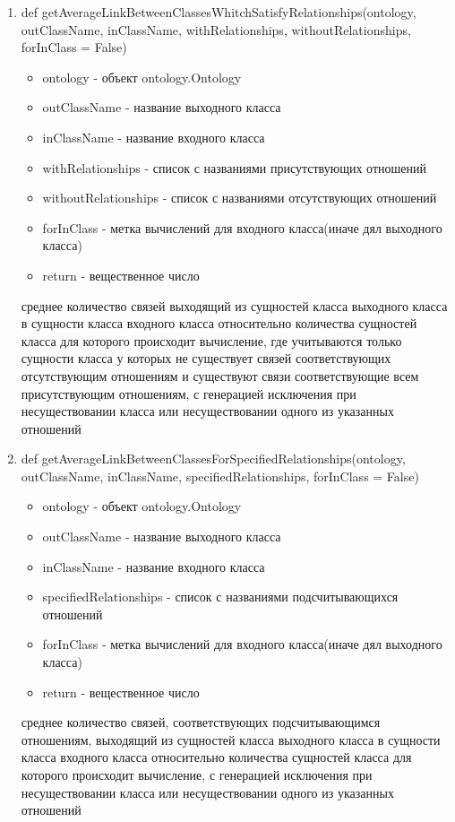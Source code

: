 \documentclass{article}
\begin{document}
\begin{enumerate}
		\item def getAverageLinkBetweenClassesWhitchSatisfyRelationships(ontology, outClassName, inClassName, withRelationships, withoutRelationships, forInClass = False)
		\begin{itemize}
			\item ontology - объект ontology.Ontology
			\item outClassName - название выходного класса
			\item inClassName - название входного класса
			\item withRelationships - список с названиями присутствующих отношений
			\item withoutRelationships - список с названиями отсутствующих отношений
			\item forInClass - метка вычислений для входного класса(иначе дял выходного класса)
			\item return - вещественное число
		\end{itemize}
		среднее количество связей выходящий из сущностей класса выходного класса в сущности класса входного класса относительно количества сущностей класса для которого происходит вычисление, где учитываются только сущности класса у которых не существует связей соответствующих отсутствующим отношениям и существуют связи соответствующие всем присутствующим отношениям, с генерацией исключения при несуществовании класса или несуществовании одного из указанных отношений 
		
		\item def getAverageLinkBetweenClassesForSpecifiedRelationships(ontology, outClassName, inClassName, specifiedRelationships, forInClass = False)
		\begin{itemize}
			\item ontology - объект ontology.Ontology
			\item outClassName - название выходного класса
			\item inClassName - название входного класса
			\item specifiedRelationships - список с названиями подсчитывающихся отношений
			\item forInClass - метка вычислений для входного класса(иначе дял выходного класса)
			\item return - вещественное число
		\end{itemize}
		среднее количество связей, соответствующих подсчитывающимся отношениям, выходящий из сущностей класса выходного класса в сущности класса входного класса относительно количества сущностей класса для которого происходит вычисление, с генерацией исключения при несуществовании класса или несуществовании одного из указанных отношений 
		

\end{enumerate}
\end{document}
